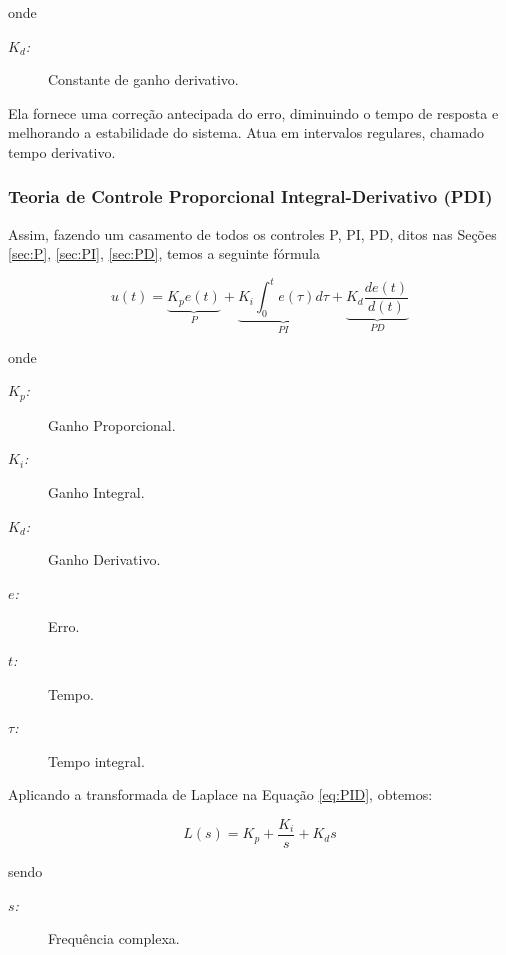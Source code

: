 \documentclass[portugues, brazil, a4paper,12pt]{article}
\begin{document}
	onde 
	
	\begin{description}
		\item[$ K_d $\textit{:}] Constante de ganho derivativo.
	\end{description}
	
	Ela fornece uma correção antecipada do erro, diminuindo o tempo de resposta e melhorando a estabilidade do sistema. Atua em intervalos regulares, chamado tempo derivativo.
	
	
	\subsubsection{Teoria de Controle Proporcional Integral-Derivativo (PDI)} \label{sec:PID}
	Assim, fazendo um casamento de todos os controles P, PI, PD, ditos nas Seções \ref{sec:P}, \ref{sec:PI}, \ref{sec:PD}, temos a seguinte fórmula
	
	\begin{equation} \label{eq:PID}
	u(t) = \underbrace{K_p e(t)}_{P} + \underbrace{K_i \int_{0}^{t} e(\tau) d\tau}_{PI} + \underbrace{K_d\frac{de(t)}{d(t)}}_{PD}
	\end{equation}
	
	onde
	
	\begin{description}
		\item[$ K_p $\textit{:}] Ganho Proporcional.
		
		\item[$ K_i $\textit{:}] Ganho Integral.
		
		\item[$ K_d $\textit{:}] Ganho Derivativo.
		
		\item[$ e $\textit{:}] Erro.
		
		\item[$ t $\textit{:}] Tempo.
		
		\item[$ \tau $\textit{:}] Tempo integral.
	\end{description}
	
	Aplicando a transformada de Laplace na Equação \ref{eq:PID}, obtemos:
	
	\begin{equation}
	L(s)=K_{p}+\frac{K_{i}}{s}+K_{d}s
	\end{equation}
	
	sendo
	
	\begin{description}
		\item[$ s $\textit{:}] Frequência complexa.
	\end{description}
	
\end{document}
